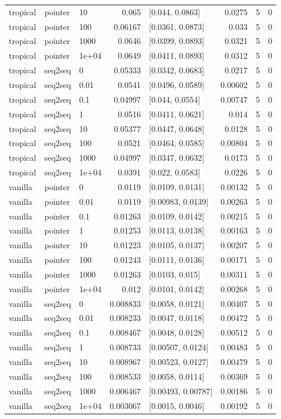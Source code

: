 \documentclass[10pt]{article}
\begin{document}
{\begin{longtable}{lllrlrrr}
tropical & pointer & 10 & 0.065 & [0.044, 0.0863] & 0.0275 & 5 & 0\\
tropical & pointer & 100 & 0.06167 & [0.0361, 0.0873] & 0.033 & 5 & 0\\
tropical & pointer & 1000 & 0.0646 & [0.0399, 0.0893] & 0.0321 & 5 & 0\\
tropical & pointer & 1e+04 & 0.0649 & [0.0411, 0.0893] & 0.0312 & 5 & 0\\
tropical & seq2seq & 0 & 0.05333 & [0.0342, 0.0683] & 0.0217 & 5 & 0\\
tropical & seq2seq & 0.01 & 0.0541 & [0.0496, 0.0589] & 0.00602 & 5 & 0\\
tropical & seq2seq & 0.1 & 0.04997 & [0.044, 0.0554] & 0.00747 & 5 & 0\\
tropical & seq2seq & 1 & 0.0516 & [0.0411, 0.0621] & 0.014 & 5 & 0\\
tropical & seq2seq & 10 & 0.05377 & [0.0447, 0.0648] & 0.0128 & 5 & 0\\
tropical & seq2seq & 100 & 0.0521 & [0.0464, 0.0585] & 0.00804 & 5 & 0\\
tropical & seq2seq & 1000 & 0.04997 & [0.0347, 0.0632] & 0.0173 & 5 & 0\\
tropical & seq2seq & 1e+04 & 0.0391 & [0.022, 0.0583] & 0.0226 & 5 & 0\\
vanilla & pointer & 0 & 0.0119 & [0.0109, 0.0131] & 0.00132 & 5 & 0\\
vanilla & pointer & 0.01 & 0.0119 & [0.00983, 0.0139] & 0.00263 & 5 & 0\\
vanilla & pointer & 0.1 & 0.01263 & [0.0109, 0.0142] & 0.00215 & 5 & 0\\
vanilla & pointer & 1 & 0.01253 & [0.0113, 0.0138] & 0.00163 & 5 & 0\\
vanilla & pointer & 10 & 0.01223 & [0.0105, 0.0137] & 0.00207 & 5 & 0\\
vanilla & pointer & 100 & 0.01243 & [0.0111, 0.0136] & 0.00171 & 5 & 0\\
vanilla & pointer & 1000 & 0.01263 & [0.0103, 0.015] & 0.00311 & 5 & 0\\
vanilla & pointer & 1e+04 & 0.012 & [0.0101, 0.0142] & 0.00268 & 5 & 0\\
vanilla & seq2seq & 0 & 0.008833 & [0.0058, 0.0121] & 0.00407 & 5 & 0\\
vanilla & seq2seq & 0.01 & 0.008233 & [0.0047, 0.0118] & 0.00472 & 5 & 0\\
vanilla & seq2seq & 0.1 & 0.008467 & [0.0048, 0.0128] & 0.00512 & 5 & 0\\
vanilla & seq2seq & 1 & 0.008733 & [0.00507, 0.0124] & 0.00483 & 5 & 0\\
vanilla & seq2seq & 10 & 0.008967 & [0.00523, 0.0127] & 0.00479 & 5 & 0\\
vanilla & seq2seq & 100 & 0.008533 & [0.0058, 0.0114] & 0.00369 & 5 & 0\\
vanilla & seq2seq & 1000 & 0.006467 & [0.00493, 0.00787] & 0.00186 & 5 & 0\\
vanilla & seq2seq & 1e+04 & 0.003067 & [0.0015, 0.0046] & 0.00192 & 5 & 0\\
\bottomrule
\end{longtable}
}
\end{document}
